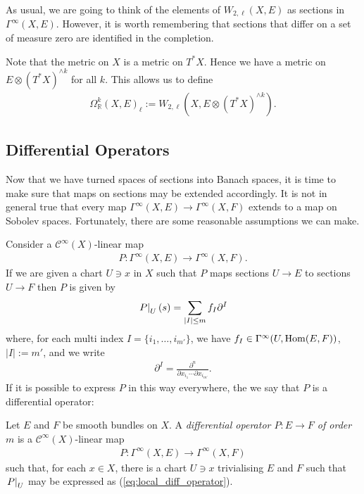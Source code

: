 \documentclass[12pt]{ociamthesis}  %
\begin{document}
As usual, we are going to think of the elements of $W_{2,\ell}(X,E)$ as
sections in $\Gamma^\infty(X,E)$. However, it is worth remembering that
sections that differ on a set of measure zero are identified in the
completion.

\begin{example}
  Note that the metric on $X$ is a metric on $T^*X$. Hence we have
  a metric on $E\otimes (T^*X)^{\wedge k}$ for all $k$. This allows
  us to define
  \begin{align*}
    \Omega_{\mathbb{R}}^k(X,E)_\ell := W_{2,\ell}(X,E\otimes(T^*X)^{\wedge k}).
  \end{align*}
\end{example}

\subsection{Differential Operators}

Now that we have turned spaces of sections into Banach spaces, it is
time to make sure that maps on sections may be extended accordingly.
It is not in general true that every map
$\Gamma^\infty(X,E)\to\Gamma^\infty(X,F)$ extends to a map on
Sobolev spaces. Fortunately, there are some reasonable assumptions
we can make.

Consider a $\mathscr C^\infty(X)$-linear map
\begin{align*}
  P : \Gamma^\infty(X,E) \to \Gamma^\infty(X,F).
\end{align*}
If we are given a chart $U\ni x$ in $X$ such that $P$ maps sections
$U\to E$ to sections $U\to F$ then $P$ is given by
\begin{align}\label{eq:local_diff_operator}
  \left.{P}\right\vert_{U}(s) = \sum_{|I|\leq m} f_I \partial^I
\end{align}
where, for each multi index $I=\{i_1,\ldots,i_{m'}\}$, we have
$f_I\in\Gamma^\infty(U,\operatorname{Hom}(E,F))$, $|I| := m'$, and we write
\begin{align*}
  \partial^I = \frac{\partial^n}{\partial x_{i_1} \cdots \partial x_{i_{m'}}}.
\end{align*}
If it is possible to express $P$ in this way everywhere,
the we say that $P$ is a differential operator:

\begin{definition}\label{def:diff_operator}
  Let $E$ and $F$ be smooth bundles on $X$. A \emph{differential
    operator $P:E\to F$ of order $m$} is a $\mathscr C^\infty(X)$-linear map
  \begin{align*}
    P : \Gamma^\infty(X,E) \to \Gamma^\infty(X,F)
  \end{align*}
  such that, for each $x\in X$, there is a chart $U\ni x$ trivialising $E$ and
  $F$ such that $\left.{P}\right\vert_{U}$ may be expressed as
  (\ref{eq:local_diff_operator}).
\end{definition}
\end{document}
